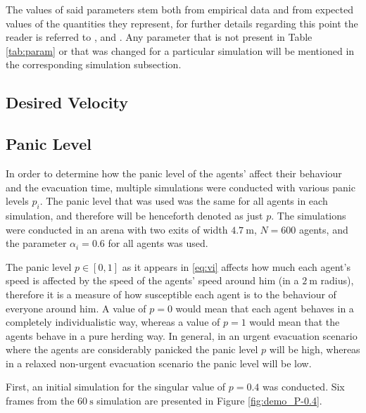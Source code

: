 The values of said parameters stem both from empirical data and from expected values of the quantities they represent, for further details regarding this point the reader is referred to \cite{Helbing2000}, \cite{Zainuddin2010} and \cite{Wang2016}. Any parameter that is not present in Table \ref{tab:param} or that was changed for a particular simulation will be mentioned in the corresponding simulation subsection.


\subsection{Desired Velocity} \label{sec:6.1-velocity}


\subsection{Panic Level} \label{sec:6.2-panic}
In order to determine how the panic level of the agents' affect their behaviour and the evacuation time, multiple simulations were conducted with various panic levels $p_i$. The panic level that was used was the same for all agents in each simulation, and therefore will be henceforth denoted as just $p$. The simulations were conducted in an arena with two exits of width $\SI{4.7}{\meter}$, $N=600$ agents, and the parameter $\alpha_i=0.6$ for all agents was used.

The panic level $p \in [0,1]$ as it appears in \eqref{eq:vi} affects how much each agent's speed is affected by the speed of the agents' speed around him (in a $\SI{2}{\meter}$ radius), therefore it is a measure of how susceptible each agent is to the behaviour of everyone around him. A value of $p=0$ would mean that each agent behaves in a completely individualistic way, whereas a value of $p=1$ would mean that the agents behave in a pure herding way. In general, in an urgent evacuation scenario where the agents are considerably panicked the panic level $p$ will be high, whereas in a relaxed non-urgent evacuation scenario the panic level will be low.

First, an initial simulation for the singular value of $p = 0.4$ was conducted. Six frames from the $\SI{60}{\second}$ simulation are presented in Figure \ref{fig:demo_P-0.4}.

